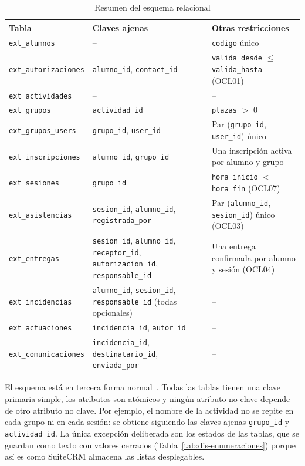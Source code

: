 \begin{table}[H]
\centering\footnotesize
\begin{tabularx}{\textwidth}{>{\hsize=0.85\hsize\raggedright\arraybackslash}X>{\hsize=1.35\hsize\raggedright\arraybackslash}X>{\hsize=0.80\hsize\raggedright\arraybackslash}X}
\toprule
\rowcolor{cabeceratabla} \textbf{Tabla} & \textbf{Claves ajenas} & \textbf{Otras restricciones} \\
\midrule
\texttt{ext\_alumnos} & -- & \texttt{codigo} único \\
\texttt{ext\_autorizaciones} & \texttt{alumno\_id}, \texttt{contact\_id} & \texttt{valida\_desde} $\leq$ \texttt{valida\_hasta} (OCL01) \\
\texttt{ext\_actividades} & -- & -- \\
\texttt{ext\_grupos} & \texttt{actividad\_id} & \texttt{plazas} $>$ 0 \\
\texttt{ext\_grupos\_users} & \texttt{grupo\_id}, \texttt{user\_id} & Par (\texttt{grupo\_id}, \texttt{user\_id}) único \\
\texttt{ext\_inscripciones} & \texttt{alumno\_id}, \texttt{grupo\_id} & Una inscripción activa por alumno y grupo \\
\texttt{ext\_sesiones} & \texttt{grupo\_id} & \texttt{hora\_inicio} $<$ \texttt{hora\_fin} (OCL07) \\
\texttt{ext\_asistencias} & \texttt{sesion\_id}, \texttt{alumno\_id}, \texttt{registrada\_por} & Par (\texttt{alumno\_id}, \texttt{sesion\_id}) único (OCL03) \\
\texttt{ext\_entregas} & \texttt{sesion\_id}, \texttt{alumno\_id}, \texttt{receptor\_id}, \texttt{autorizacion\_id}, \texttt{responsable\_id} & Una entrega confirmada por alumno y sesión (OCL04) \\
\texttt{ext\_incidencias} & \texttt{alumno\_id}, \texttt{sesion\_id}, \texttt{responsable\_id} (todas opcionales) & -- \\
\texttt{ext\_actuaciones} & \texttt{incidencia\_id}, \texttt{autor\_id} & -- \\
\texttt{ext\_comunicaciones} & \texttt{incidencia\_id}, \texttt{destinatario\_id}, \texttt{enviada\_por} & -- \\
\bottomrule
\end{tabularx}
\caption{Resumen del esquema relacional}\label{tab:dis-esquema}
\end{table}

El esquema está en tercera forma normal~\cite{ref51}. Todas las tablas tienen una clave primaria simple, los atributos son atómicos y ningún atributo no clave depende de otro atributo no clave. Por ejemplo, el nombre de la actividad no se repite en cada grupo ni en cada sesión: se obtiene siguiendo las claves ajenas \texttt{grupo\_id} y \texttt{actividad\_id}. La única excepción deliberada son los estados de las tablas, que se guardan como texto con valores cerrados (Tabla~\ref{tab:dis-enumeraciones}) porque así es como SuiteCRM almacena las listas desplegables.

